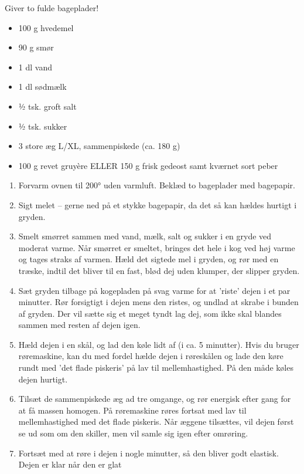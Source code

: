 \documentclass[
]{book}
\providecommand{\tightlist}{%
  \setlength{\itemsep}{0pt}\setlength{\parskip}{0pt}}
\begin{document}
Giver to fulde bageplader!

\begin{itemize}
\tightlist
\item
  100 g hvedemel
\item
  90 g smør
\item
  1 dl vand
\item
  1 dl sødmælk
\item
  1⁄2 tsk. groft salt
\item
  1⁄2 tsk. sukker
\item
  3 store æg L/XL, sammenpiskede (ca. 180 g)
\item
  100 g revet gruyère ELLER 150 g frisk gedeost samt kværnet sort peber
\end{itemize}

\begin{enumerate}
\def\labelenumi{\arabic{enumi}.}
\item
  Forvarm ovnen til 200° uden varmluft. Beklæd to bageplader med bagepapir.
\item
  Sigt melet -- gerne ned på et stykke bagepapir, da det så kan hældes hurtigt i gryden.
\item
  Smelt smørret sammen med vand, mælk, salt og sukker i en gryde ved moderat varme. Når smørret er
  smeltet, bringes det hele i kog ved høj varme og tages straks af varmen. Hæld det sigtede mel i gryden,
  og rør med en træske, indtil det bliver til en fast, blød dej uden klumper, der slipper gryden.
\item
  Sæt gryden tilbage på kogepladen på svag varme for at 'riste' dejen i et par minutter. Rør forsigtigt i
  dejen mens den ristes, og undlad at skrabe i bunden af gryden. Der vil sætte sig et meget tyndt lag dej,
  som ikke skal blandes sammen med resten af dejen igen.
\item
  Hæld dejen i en skål, og lad den køle lidt af (i ca. 5 minutter). Hvis du bruger røremaskine, kan du
  med fordel hælde dejen i røreskålen og lade den køre rundt med 'det flade piskeris' på lav til
  mellemhastighed. På den måde køles dejen hurtigt.
\item
  Tilsæt de sammenpiskede æg ad tre omgange, og rør energisk efter gang for at få massen homogen.
  På røremaskine røres fortsat med lav til mellemhastighed med det flade piskeris. Når æggene tilsættes,
  vil dejen først se ud som om den skiller, men vil samle sig igen efter omrøring.
\item
  Fortsæt med at røre i dejen i nogle minutter, så den bliver godt elastisk. Dejen er klar når den er glat

\end{enumerate}
\end{document}
